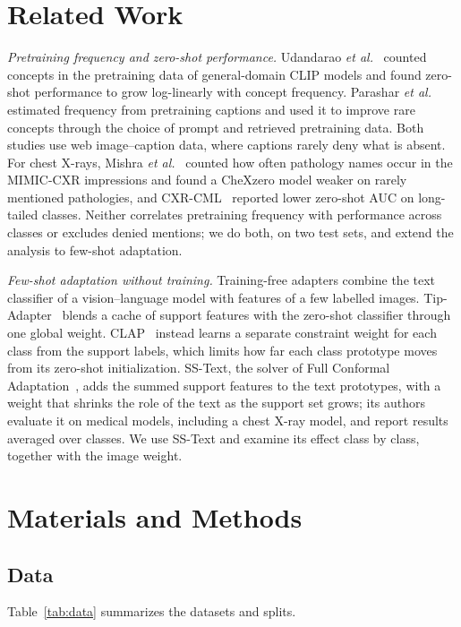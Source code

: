 \documentclass[journal]{IEEEtran}
\begin{document}
\section{Related Work}

\emph{Pretraining frequency and zero-shot performance.} Udandarao \emph{et
al.}~\cite{udandarao2024zeroshot} counted concepts in the pretraining data of general-domain CLIP models
and found zero-shot performance to grow log-linearly with concept frequency. Parashar \emph{et
al.}~\cite{parashar2024neglected} estimated frequency from pretraining captions and used it to improve
rare concepts through the choice of prompt and retrieved pretraining data.
Both studies use web image--caption data, where captions rarely deny what is absent.
For chest X-rays, Mishra \emph{et al.}~\cite{mishra2023improving} counted how often pathology names occur in the MIMIC-CXR impressions and found a CheXzero model weaker on rarely mentioned pathologies, and CXR-CML~\cite{madhipati2025cxr} reported lower zero-shot AUC on long-tailed classes. Neither correlates pretraining frequency with performance across classes or excludes denied mentions; we do both, on two test sets, and extend the analysis to few-shot adaptation.

\emph{Few-shot adaptation without training.} Training-free adapters combine the text classifier of a
vision--language model with features of a few labelled images. 
Tip-Adapter~\cite{zhang2022tip} blends a cache of support features with the zero-shot classifier through one global weight. 
CLAP~\cite{silva2024closer} instead learns a separate constraint weight for each class from the support labels, which limits how far each class prototype moves from its zero-shot initialization.
SS-Text, the solver of Full Conformal Adaptation~\cite{silvarodriguez2025fca}, adds the summed support features to
the text prototypes, with a weight that shrinks the role of the text as the support set grows; its
authors evaluate it on medical models, including a chest X-ray model, and report results averaged over
classes. We use SS-Text and examine its effect class by class, together with the image weight.

\section{Materials and Methods}

\subsection{Data}
Table~\ref{tab:data} summarizes the datasets and splits.
\end{document}
